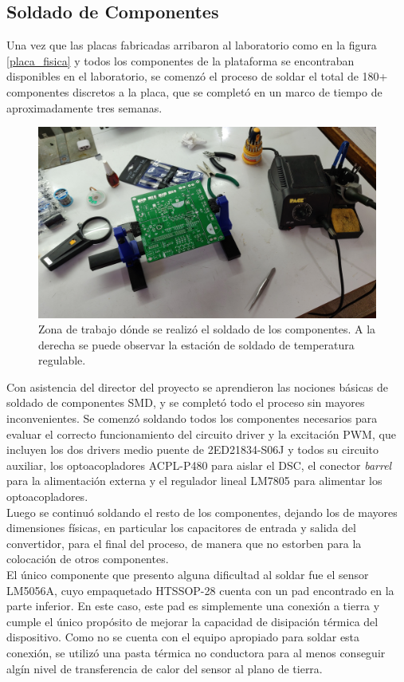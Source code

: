 \subsection{Soldado de Componentes}

Una vez que las placas fabricadas arribaron al laboratorio como en la figura \ref{placa_fisica} y todos los componentes de la plataforma se encontraban disponibles en el laboratorio, se comenzó el proceso de soldar el total de 180+ componentes discretos a la placa, que se completó en un marco de tiempo de aproximadamente tres semanas.\\

\begin{figure}[h]
    \centering
    \includegraphics[scale=0.09]{Imagenes/Soldado.jpg}
    \caption{Zona de trabajo dónde se realizó el soldado de los componentes. A la derecha se puede observar la estación de soldado de temperatura regulable.}
    \label{soldado}
\end{figure}

Con asistencia del director del proyecto se aprendieron las nociones básicas de soldado de componentes SMD, y se completó todo el proceso sin mayores inconvenientes. Se comenzó soldando todos los componentes necesarios para evaluar el correcto funcionamiento del circuito driver y la excitación PWM, que incluyen los dos drivers medio puente de 2ED21834-S06J y todos su circuito auxiliar, los optoacopladores ACPL-P480 para aislar el DSC, el conector \textit{barrel} para la alimentación externa y el regulador lineal LM7805 para alimentar los optoacopladores.\\

Luego se continuó soldando el resto de los componentes, dejando los de mayores dimensiones físicas, en particular los capacitores de entrada y salida del convertidor, para el final del proceso, de manera que no estorben para la colocación de otros componentes.\\

El único componente que presento alguna dificultad al soldar fue el sensor LM5056A, cuyo empaquetado HTSSOP-28 cuenta con un pad encontrado en la parte inferior. En este caso, este pad es simplemente una conexión a tierra y cumple el único propósito de mejorar la capacidad de disipación térmica del dispositivo. Como no se cuenta con el equipo apropiado para soldar esta conexión, se utilizó una pasta térmica no conductora para al menos conseguir algín nivel de transferencia de calor del sensor al plano de tierra.\\